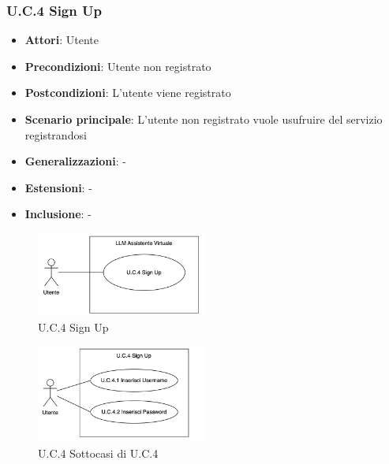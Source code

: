 \subsubsection{U.C.4 Sign Up}
\begin{itemize}
    \item \textbf{Attori}: Utente
    \item \textbf{Precondizioni}: Utente non registrato
    \item \textbf{Postcondizioni}: L'utente viene registrato
    \item \textbf{Scenario principale}: L’utente non registrato vuole usufruire del servizio registrandosi
    \item \textbf{Generalizzazioni}: -
    \item \textbf{Estensioni}: -
    \item \textbf{Inclusione}: -
\end{itemize}
\begin{figure}[H]
    \centering
    \includegraphics[width=0.5\textwidth]{img/UC4.png}
    \caption{U.C.4 Sign Up}
\end{figure}
\begin{figure}[H]
    \centering
    \includegraphics[width=0.5\textwidth]{img/UC4p1.png}
    \caption{U.C.4 Sottocasi di U.C.4}
\end{figure}
\newpage
